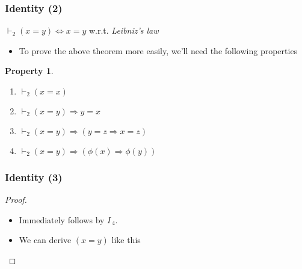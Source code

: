\documentclass{beamer}
\newtheorem{property}{Property}
\begin{document}
                \begin{frame}
                    \frametitle{Identity (2)}
                    \begin{theorem}
                        $ \vdash_2 (x = y) \Leftrightarrow x = y $ w.r.t. \textit{Leibniz's law}
                    \end{theorem}
                    \begin{itemize}
                        \item To prove the above theorem more easily, we'll need the following properties
                    \end{itemize}
                    \begin{property}
                        \begin{enumerate}
                            \item[$ I_{\,1} $] $ \vdash_2 (x = x) $
                            \item[$ I_{\,2} $] $ \vdash_2 (x = y) \Rightarrow y = x $
                            \item[$ I_{\,3} $] $ \vdash_2 (x = y) \Rightarrow (y = z \Rightarrow x = z) $
                            \item[$ I_{\,4} $] $ \vdash_2 (x = y) \Rightarrow (\phi(x) \Rightarrow \phi(y)) $
                        \end{enumerate}
                    \end{property}
                \end{frame}

                \begin{frame}
                    \frametitle{Identity (3)}
                    \begin{proof}
                        \begin{itemize}
                            \item [$ \Rightarrow $] Immediately follows by $ I_{\,4} $.
                            \item [$ \Leftarrow $] We can derive $ (x = y) $ like this
                                \begin{prooftree}
                                \end{prooftree}
                        \end{itemize}
                    \end{proof}
                \end{frame}
\end{document}
